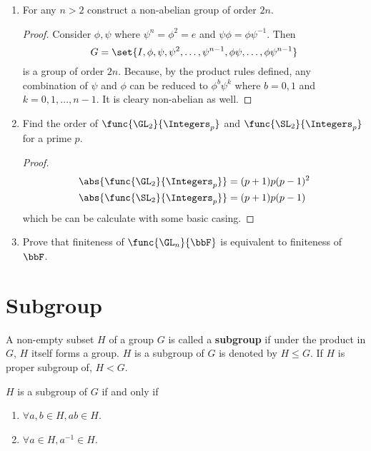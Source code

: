 \begin{enumerate}
\begin{proof}
        Let \(A = \set<g>{g \neq g^{-1}}\) and \(B = \set<g>{g = g^{-1}}\). Note that, \(\abs{A}\) is even since  \(g  \in A \implies g^{-1} \in A\). Moreover, \(\abs{G} = \abs{A} + \abs{B}\), therefore \(\abs{B}\) must be even and since \(e \in B\), \(\abs{B} \geq 2\).
    \end{proof}
    \item For any \(n > 2\) construct a non-abelian group of order \(2n\).
    \begin{proof}
        Consider \(\phi, \psi\) where \(\psi^n = \phi^2 = e \) and \(\psi \phi = \phi \psi^{-1}\). Then
        \begin{equation*}
            G = \set{I, \phi ,\psi, \psi^2, \dots ,\psi^{n-1}, \phi \psi, \dots , \phi \psi^{n-1}}
        \end{equation*}
        is a group of order \(2n\). Because, by the product rules defined, any combination of \(\psi\) and \(\phi\) can be reduced to \(\phi^b \psi^k\) where \(b = 0,1\) and \(k = 0,1 , \dots, n-1\). It is cleary non-abelian as well.
    \end{proof}
    \item Find the order of \(\func{\GL_2}{\Integers_p}\) and \(\func{\SL_2}{\Integers_p}\) for a prime \(p\).
    \begin{proof}
        \begin{align*}
            \abs{\func{\GL_2}{\Integers_p}} &= (p+1) p (p-1)^2\\
            \abs{\func{\SL_2}{\Integers_p}} &= (p+1) p (p-1)
        \end{align*}
        which be can be calculate with some basic casing.
    \end{proof}
    \item Prove that finiteness of \(\func{\GL_n}{\bbF}\) is equivalent to finiteness of \(\bbF\).
\end{enumerate}

\section{Subgroup}
\begin{definition}
    A non-empty subset \(H\) of a group \(G\) is called a \textbf{subgroup} if under the product in \(G\), \(H\) itself forms a group. \(H\) is a subgroup of \(G\) is denoted by \(H \leq G\). If \(H\) is proper subgroup of, \(H < G\).
\end{definition}

\begin{lemma}\label{lm:subgroupConditions}
    \(H\) is a subgroup of \(G\) if and only if 
    \begin{enumerate}
        \item \(\forall a,b \in H, ab \in H\).
        \item \(\forall a \in H, a^{-1} \in H\).
    \end{enumerate}
\end{lemma}

